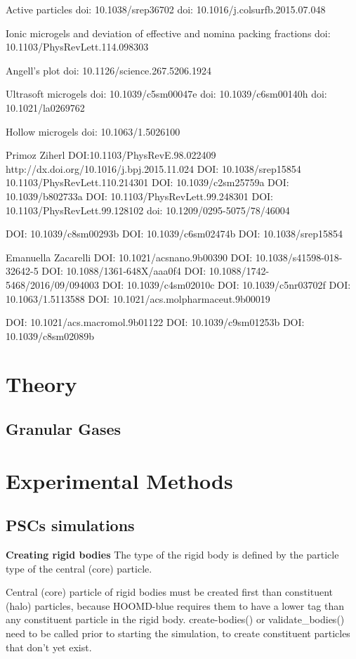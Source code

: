 \documentclass[11pt]{article}
\begin{document}
Active particles
doi: 10.1038/srep36702
doi: 10.1016/j.colsurfb.2015.07.048

Ionic microgels and deviation of effective and nomina packing fractions
doi: 10.1103/PhysRevLett.114.098303

Angell's plot
doi: 10.1126/science.267.5206.1924

Ultrasoft microgels
doi: 10.1039/c5sm00047e
doi: 10.1039/c6sm00140h
doi: 10.1021/la0269762

Hollow microgels
doi: 10.1063/1.5026100

Primoz Ziherl
DOI:10.1103/PhysRevE.98.022409
http://dx.doi.org/10.1016/j.bpj.2015.11.024
DOI: 10.1038/srep15854
10.1103/PhysRevLett.110.214301
DOI: 10.1039/c2sm25759a 
DOI: 10.1039/b802733a 
DOI: 10.1103/PhysRevLett.99.248301 
DOI: 10.1103/PhysRevLett.99.128102 
doi: 10.1209/0295-5075/78/46004

DOI: 10.1039/c8sm00293b 
DOI: 10.1039/c6sm02474b 
DOI: 10.1038/srep15854 


Emanuella Zacarelli
DOI: 10.1021/acsnano.9b00390 
DOI: 10.1038/s41598-018-32642-5 
DOI: 10.1088/1361-648X/aaa0f4 
DOI: 10.1088/1742-5468/2016/09/094003 
DOI: 10.1039/c4sm02010c 
DOI: 10.1039/c5nr03702f 
DOI: 10.1063/1.5113588 
DOI: 10.1021/acs.molpharmaceut.9b00019 

DOI: 10.1021/acs.macromol.9b01122 
DOI: 10.1039/c9sm01253b 
DOI: 10.1039/c8sm02089b


\section{Theory}

\subsection{Granular Gases}


\section{Experimental Methods}
\subsection{PSCs simulations}
\textbf{Creating rigid bodies}
The type of the rigid body is defined by the particle type of the central (core) particle.

Central (core) particle of rigid bodies must be created first than constituent (halo) particles, because HOOMD-blue requires them to have a lower tag than any constituent particle in the rigid body. create-bodies() or validate_bodies() need to be called prior to starting the simulation, to create constituent particles that don't yet exist.
\end{document}
